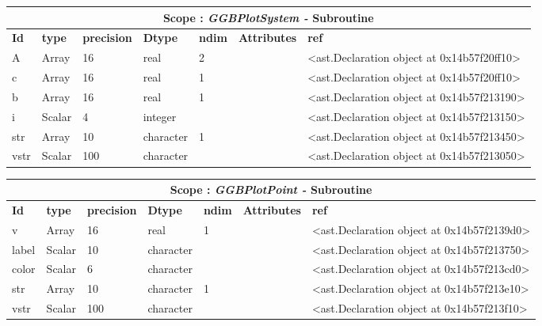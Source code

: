 \documentclass{report}
\begin{document}
\begin{center}
\begin{longtable}{|p{3.5cm}|p{1.5cm}|p{1.5cm}|p{1.5cm}|p{1cm}|p{2cm}|p{4cm}| }
\hline
\multicolumn{7}{|c|}{\textbf{Scope : \qquad}  \textbf{\textit{GGBPlotSystem - }Subroutine}}\\ 
\hline
\textbf{Id} & \textbf{type} & \textbf{precision} & \textbf{Dtype} & \textbf{ndim} & \textbf{Attributes} & \textbf{ref} \\\hline

A & Array & 16 & real & 2 &  & <ast.Declaration object at 0x14b57f20ff10> \\\hline

c & Array & 16 & real & 1 &  & <ast.Declaration object at 0x14b57f20ff10> \\\hline

b & Array & 16 & real & 1 &  & <ast.Declaration object at 0x14b57f213190> \\\hline

i & Scalar & 4 & integer &  &  & <ast.Declaration object at 0x14b57f213150> \\\hline

str & Array & 10 & character & 1 &  & <ast.Declaration object at 0x14b57f213450> \\\hline

vstr & Scalar & 100 & character &  &  & <ast.Declaration object at 0x14b57f213050> \\\hline

\end{longtable}
\end{center}

 \vspace{1cm}

\begin{center}
\begin{longtable}{|p{3.5cm}|p{1.5cm}|p{1.5cm}|p{1.5cm}|p{1cm}|p{2cm}|p{4cm}| }
\hline
\multicolumn{7}{|c|}{\textbf{Scope : \qquad}  \textbf{\textit{GGBPlotPoint - }Subroutine}}\\ 
\hline
\textbf{Id} & \textbf{type} & \textbf{precision} & \textbf{Dtype} & \textbf{ndim} & \textbf{Attributes} & \textbf{ref} \\\hline

v & Array & 16 & real & 1 &  & <ast.Declaration object at 0x14b57f2139d0> \\\hline

label & Scalar & 10 & character &  &  & <ast.Declaration object at 0x14b57f213750> \\\hline

color & Scalar & 6 & character &  &  & <ast.Declaration object at 0x14b57f213cd0> \\\hline

str & Array & 10 & character & 1 &  & <ast.Declaration object at 0x14b57f213e10> \\\hline

vstr & Scalar & 100 & character &  &  & <ast.Declaration object at 0x14b57f213f10> \\\hline

\end{longtable}
\end{center}
\end{document}
